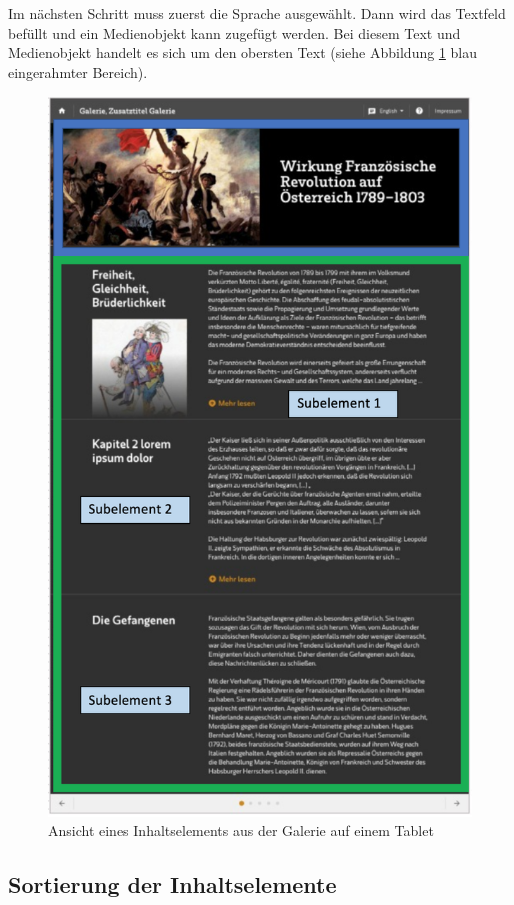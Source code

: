 Im nächsten Schritt muss zuerst die Sprache ausgewählt. Dann wird das Textfeld befüllt und ein Medienobjekt kann zugefügt werden. Bei diesem Text und Medienobjekt handelt es sich um den obersten Text (siehe Abbildung \ref{img:ansicht_inhaltselement_galerie} blau eingerahmter Bereich).

\begin{figure}[ht!]
\centering
\includegraphics[width=12cm]{Figures/paula/galerie/ansicht_inhaltselement_galerie.png}
\caption{Ansicht eines Inhaltselements aus der Galerie auf einem Tablet}
\label{img:ansicht_inhaltselement_galerie}
\end{figure}

\subsection{Sortierung der Inhaltselemente}

